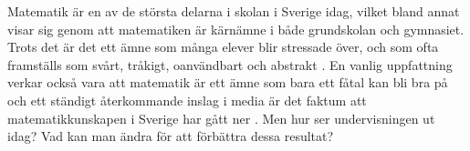 \textcolor{lila}{Matematik är en av de största delarna i skolan i Sverige idag, vilket bland annat visar sig genom att matematiken är kärnämne i både grundskolan och gymnasiet. Trots det är det ett ämne som många elever blir stressade över, och som ofta framställs som svårt, tråkigt, oanvändbart och abstrakt \cite{Ignacio&Barona}. En vanlig uppfattning verkar också vara att matematik är ett ämne som bara ett fåtal kan bli bra på \cite{Skolverket03} och ett ständigt återkommande inslag i media är det faktum att matematikkunskapen i Sverige har gått ner \cite{CompareOECD}. Men hur ser undervisningen ut idag? Vad kan man ändra för att förbättra dessa resultat?}

